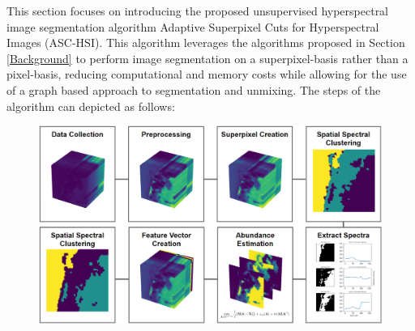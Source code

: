This section focuses on introducing the proposed unsupervised hyperspectral image segmentation algorithm Adaptive Superpixel Cuts for Hyperspectral Images (ASC-HSI). This algorithm leverages the algorithms proposed in Section \ref{Background} to perform image segmentation on a superpixel-basis rather than a pixel-basis, reducing computational and memory costs while allowing for the use of a graph based approach to segmentation and unmixing. The steps of the algorithm can depicted as follows:
\begin{figure}[h]
    \centering %
    \includegraphics[scale=0.4]{algorithm_view.png}  %
    \label{fig:label}  %
  \end{figure}
  

